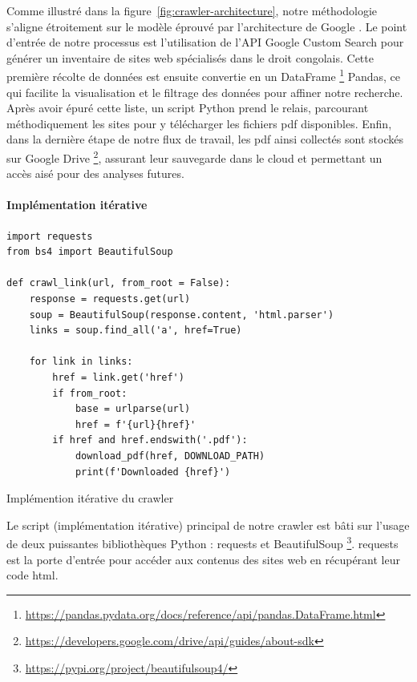 Comme illustré dans la figure~\ref{fig:crawler-architecture}, notre méthodologie s'aligne étroitement sur le modèle éprouvé par l'architecture de Google \cite{BRIN1998107}. Le point d'entrée de notre processus est l'utilisation de l'API Google Custom Search pour générer un inventaire de sites web spécialisés dans le droit congolais. Cette première récolte de données est ensuite convertie en un DataFrame \footnote{\href{https://pandas.pydata.org/docs/reference/api/pandas.DataFrame.html}{https://pandas.pydata.org/docs/reference/api/pandas.DataFrame.html}} Pandas, ce qui facilite la visualisation et le filtrage des données pour affiner notre recherche. Après avoir épuré cette liste, un script Python prend le relais, parcourant méthodiquement les sites pour y télécharger les fichiers \ac{pdf} disponibles. Enfin, dans la dernière étape de notre flux de travail, les \ac{pdf} ainsi collectés sont stockés sur Google Drive \footnote{\href{https://developers.google.com/drive/api/guides/about-sdk}{https://developers.google.com/drive/api/guides/about-sdk}}, assurant leur sauvegarde dans le cloud et permettant un accès aisé pour des analyses futures.

\paragraph{Implémentation itérative} \hspace{0pt}

\begin{listing}[!ht]
\begin{verbatim}
import requests
from bs4 import BeautifulSoup

def crawl_link(url, from_root = False):
    response = requests.get(url)
    soup = BeautifulSoup(response.content, 'html.parser')
    links = soup.find_all('a', href=True)

    for link in links:
        href = link.get('href')
        if from_root:
            base = urlparse(url)
            href = f'{url}{href}'
        if href and href.endswith('.pdf'):
            download_pdf(href, DOWNLOAD_PATH)
            print(f'Downloaded {href}')
\end{verbatim}
\caption{Implémention itérative du crawler}
\label{appendix:code:python:iterative-crawl-function}
\end{listing}

Le script (implémentation itérative) principal de notre crawler est bâti sur l'usage de deux puissantes bibliothèques Python : requests et BeautifulSoup \footnote{\href{https://pypi.org/project/beautifulsoup4/}{https://pypi.org/project/beautifulsoup4/}}. requests  est la porte d'entrée pour accéder aux contenus des sites web en récupérant leur code \ac{html}.

